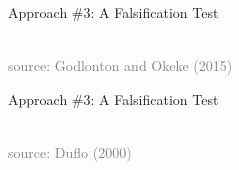 \documentclass[10pt,xcolor=table,ignorenonframetext,handout,aspectratio=169]{beamer}
\begin{document}
\begin{frame}{Approach \#3:  A Falsification Test}

\medskip
\begin{center}
 \\

\tiny{\textcolor{gray}{source:  Godlonton and Okeke (2015)}}
\end{center}


\end{frame}




\newpage
\begin{frame}{Approach \#3:  A Falsification Test}
\begin{center}

\\

\tiny{\textcolor{gray}{source:  Duflo (2000)}}

\end{center}
\end{frame}


\end{document}
